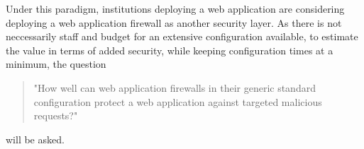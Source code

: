 Under this paradigm, institutions deploying a web application are considering deploying a web application firewall as another security layer. As there is not neccessarily staff and budget for an extensive configuration available, to estimate the value in terms of added security, while keeping configuration times at a minimum, the question
\begin{quote} "How well can web application firewalls in their generic standard configuration protect a web application against targeted malicious requests?" 
\end{quote}
will be asked. \\
